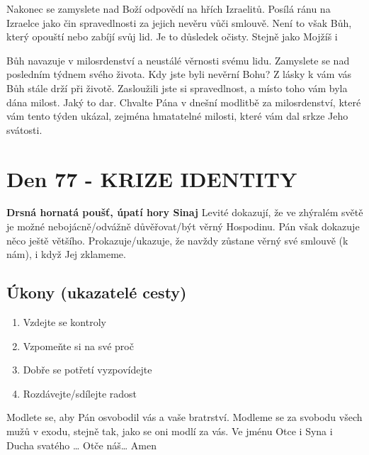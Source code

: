 \documentclass[11pt]{article}
\newcommand{\zacatekJedenactyTyden}{
\textbf{Drsná hornatá poušť, úpatí hory Sinaj} \newline 
Levité dokazují, že ve zhýralém světě je možné nebojácně/odvážně důvěřovat/být věrný Hospodinu. Pán však dokazuje něco ještě většího. Prokazuje/ukazuje, že navždy zůstane věrný své smlouvě (k nám), i když Jej zklameme.

\subsection*{Úkony (ukazatelé cesty)}
\begin{enumerate}
  \item Vzdejte se kontroly
  \item Vzpomeňte si na své proč
  \item Dobře se potřetí vyzpovídejte
  \item Rozdávejte/sdílejte radost
\end{enumerate}
Modlete se, aby Pán osvobodil vás a vaše bratrství. \newline
Modleme se za svobodu všech mužů v exodu, stejně tak, jako se oni modlí za vás.\newline
Ve jménu Otce i Syna i Ducha svatého …  Otče náš… Amen
}
\begin{document}
Nakonec se zamyslete nad Boží odpovědí na hřích Izraelitů. Posílá ránu na Izraelce jako čin spravedlnosti za jejich
nevěru vůči smlouvě. Není to však Bůh, který opouští nebo zabíjí svůj lid. Je to důsledek očisty. Stejně jako Mojžíš i

Bůh navazuje v milosrdenství a neustálé věrnosti svému lidu.
Zamyslete se nad posledním týdnem svého života. Kdy jste byli nevěrní Bohu? Z lásky k vám vás Bůh stále drží při
životě. Zasloužili jste si spravedlnost, a místo toho vám byla dána milost. Jaký to dar. Chvalte Pána v dnešní modlitbě
za milosrdenství, které vám tento týden ukázal, zejména hmatatelné milosti, které vám dal srkze Jeho svátosti.



\newpage
\section{Den 77 - KRIZE IDENTITY}
\zacatekJedenactyTyden
\end{document}
